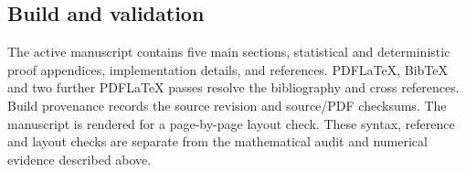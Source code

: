 \subsection{Build and validation}
The active manuscript contains five main sections, statistical and deterministic proof appendices, implementation details, and references. PDFLaTeX, BibTeX and two further PDFLaTeX passes resolve the bibliography and cross references. Build provenance records the source revision and source/PDF checksums. The manuscript is rendered for a page-by-page layout check. These syntax, reference and layout checks are separate from the mathematical audit and numerical evidence described above.
